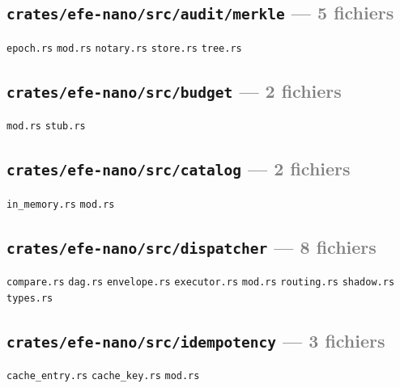 \documentclass[10pt]{report}
\newcommand{\code}[1]{\texttt{\small #1}}
\begin{document}
\subsection*{\code{crates/efe-nano/src/audit/merkle} \normalfont\textcolor{grey}{--- 5 fichiers}}
\begin{sloppypar}\footnotesize\raggedright
\code{epoch.rs} \;\textbullet\; \code{mod.rs} \;\textbullet\; \code{notary.rs} \;\textbullet\; \code{store.rs} \;\textbullet\; \code{tree.rs}
\end{sloppypar}

\subsection*{\code{crates/efe-nano/src/budget} \normalfont\textcolor{grey}{--- 2 fichiers}}
\begin{sloppypar}\footnotesize\raggedright
\code{mod.rs} \;\textbullet\; \code{stub.rs}
\end{sloppypar}

\subsection*{\code{crates/efe-nano/src/catalog} \normalfont\textcolor{grey}{--- 2 fichiers}}
\begin{sloppypar}\footnotesize\raggedright
\code{in\_memory.rs} \;\textbullet\; \code{mod.rs}
\end{sloppypar}

\subsection*{\code{crates/efe-nano/src/dispatcher} \normalfont\textcolor{grey}{--- 8 fichiers}}
\begin{sloppypar}\footnotesize\raggedright
\code{compare.rs} \;\textbullet\; \code{dag.rs} \;\textbullet\; \code{envelope.rs} \;\textbullet\; \code{executor.rs} \;\textbullet\; \code{mod.rs} \;\textbullet\; \code{routing.rs} \;\textbullet\; \code{shadow.rs} \;\textbullet\; \code{types.rs}
\end{sloppypar}

\subsection*{\code{crates/efe-nano/src/idempotency} \normalfont\textcolor{grey}{--- 3 fichiers}}
\begin{sloppypar}\footnotesize\raggedright
\code{cache\_entry.rs} \;\textbullet\; \code{cache\_key.rs} \;\textbullet\; \code{mod.rs}
\end{sloppypar}
\end{document}
